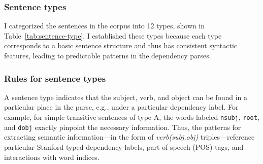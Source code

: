 \subsubsection{Sentence types}

I categorized the sentences in the corpus into 12 types, shown in
Table~\ref{tab:sentence-type}. I established these types because each
type corresponds to a basic sentence structure and thus has consistent
syntactic features, leading to predictable patterns in the dependency
parses.

\subsubsection{Rules for sentence types}

A sentence type indicates that the subject,
verb, and object can be found in a particular place in the parse,
e.g., under a particular dependency label.
For example, for simple transitive sentences of type A,
the words labeled {\tt nsubj}, {\tt root}, and {\tt dobj} exactly
pinpoint the necessary information.
Thus, the patterns for extracting semantic information---in the form
of \textit{verb(subj,obj)} triples---reference particular Stanford
typed dependency labels, part-of-speech (POS) tags, and interactions
with word indices.


